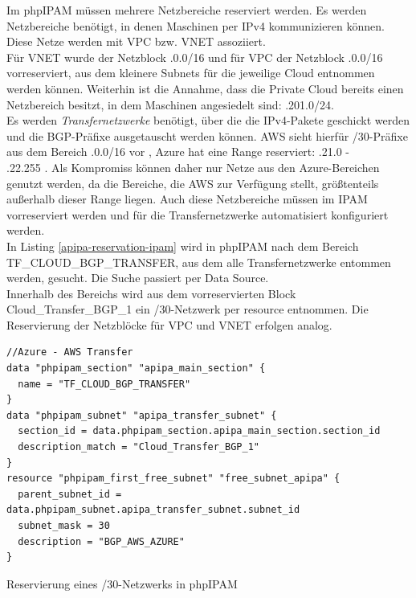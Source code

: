 Im phpIPAM müssen mehrere Netzbereiche reserviert werden. Es werden Netzbereiche benötigt, in denen Maschinen per IPv4 kommunizieren können. Diese Netze werden mit \gls{VPC} bzw. \gls{VNET} assoziiert.\\
Für \gls{VNET} wurde der Netzblock .0.0/16\grqq{} und für \gls{VPC} der Netzblock .0.0/16\grqq{} vorreserviert, aus dem kleinere Subnets für die jeweilige Cloud entnommen werden können. Weiterhin ist die Annahme, dass die Private Cloud bereits einen Netzbereich besitzt, in dem Maschinen angesiedelt sind: .201.0/24.\grqq{}\\
Es werden \textit{Transfernetzwerke}\label{transfer-azure-aws} benötigt, über die die IPv4-Pakete geschickt werden und die \gls{BGP}-Präfixe ausgetauscht werden können. AWS sieht hierfür /30-Präfixe aus dem Bereich .0.0/16\grqq{} vor \cite{awsvpn2021}, Azure hat eine Range reserviert: .21.0\grqq{} -\\ .22.255\grqq{} \cite{azurebgp2020}. Als Kompromiss können daher nur Netze aus den Azure-Bereichen genutzt werden, da die Bereiche, die AWS zur Verfügung stellt, größtenteils außerhalb dieser Range liegen. Auch diese Netzbereiche müssen im \gls{IPAM} vorreserviert werden und für die Transfernetzwerke automatisiert konfiguriert werden.\\
In Listing \ref{apipa-reservation-ipam} wird in phpIPAM nach dem Bereich \glqq TF\_CLOUD\_BGP\_TRANSFER\grqq{}, aus dem alle Transfernetzwerke entommen werden, gesucht. Die Suche passiert per Data Source.\\
Innerhalb des Bereichs wird aus dem vorreservierten Block \glqq Cloud\_Transfer\_BGP\_1\grqq{} ein /30-Netzwerk per resource entnommen. Die Reservierung der Netzblöcke für \gls{VPC} und \gls{VNET} erfolgen analog.
\begin{listing}[h]
\begin{verbatim}
//Azure - AWS Transfer
data "phpipam_section" "apipa_main_section" {
  name = "TF_CLOUD_BGP_TRANSFER"
}
data "phpipam_subnet" "apipa_transfer_subnet" {
  section_id = data.phpipam_section.apipa_main_section.section_id
  description_match = "Cloud_Transfer_BGP_1"
} 
resource "phpipam_first_free_subnet" "free_subnet_apipa" {
  parent_subnet_id = data.phpipam_subnet.apipa_transfer_subnet.subnet_id
  subnet_mask = 30
  description = "BGP_AWS_AZURE"
}
\end{verbatim}
\caption{Reservierung eines /30-Netzwerks in phpIPAM}
\label{apipa-reservation-ipam}
\end{listing}\FloatBarrier
